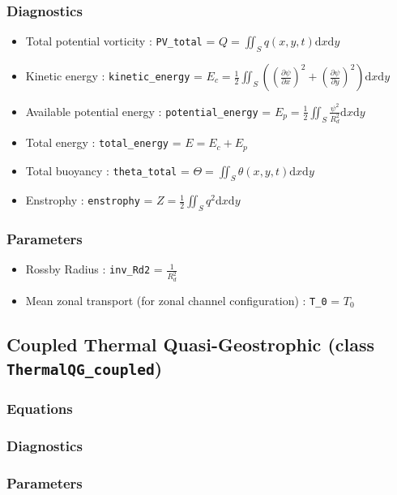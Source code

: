 \documentclass[12pt]{article}
\numberwithin{equation}{section}%
\begin{document}
\subsubsection{Diagnostics}
\begin{itemize}
	\item Total potential vorticity : \verb|PV_total| = $Q = \iint_S q(x, y, t) \mathrm{d}x\mathrm{d}y$
	\item Kinetic energy : \verb|kinetic_energy| = $E_c = \frac{1}{2} \iint_S \left((\frac{\partial \psi}{\partial x})^2 + (\frac{\partial \psi}{\partial y})^2\right) \mathrm{d}x\mathrm{d}y$
	\item Available potential energy : \verb|potential_energy| = $E_p = \frac{1}{2}\iint_S \frac{\psi^2}{R_d^2}\mathrm{d}x\mathrm{d}y$
	\item Total energy : \verb|total_energy| = $E = E_c + E_p$
	\item Total buoyancy : \verb|theta_total| = $\Theta = \iint_S \theta(x, y, t)\mathrm{d}x\mathrm{d}y$
	\item Enstrophy : \verb|enstrophy| = $Z =\frac{1}{2} \iint_S q^2 \mathrm{d}x\mathrm{d}y$
\end{itemize}

\subsubsection{Parameters}

\begin{itemize}
	\item Rossby Radius : \verb|inv_Rd2| = $\frac{1}{R_d^2}$
	\item Mean zonal transport (for zonal channel configuration) : \verb|T_0| = $T_0$
\end{itemize}

\subsection{Coupled Thermal Quasi-Geostrophic (class \texttt{ThermalQG\_coupled})}
\subsubsection{Equations}
\subsubsection{Diagnostics}
\subsubsection{Parameters}
\end{document}
